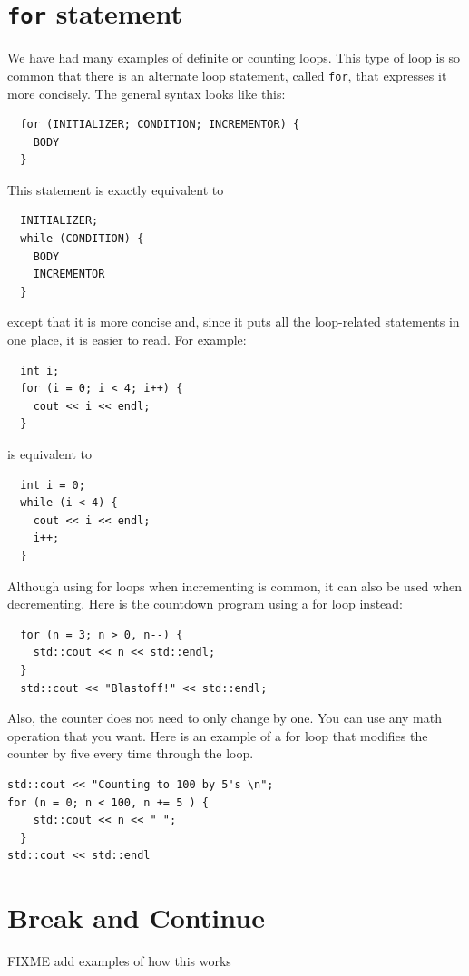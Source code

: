 \section{{\tt for} statement}
We have had many examples of definite or counting loops.
This type of loop is so common that there is an alternate
loop statement, called {\tt for}, that expresses it more
concisely.  The general syntax looks like this:

\begin{verbatim}
  for (INITIALIZER; CONDITION; INCREMENTOR) {
    BODY
  }
\end{verbatim}
%
This statement is exactly equivalent to

\begin{verbatim}
  INITIALIZER;
  while (CONDITION) {
    BODY
    INCREMENTOR
  }
\end{verbatim}
%
except that it is more concise and, since it puts all the
loop-related statements in one place, it is easier to read.
For example:

\begin{verbatim}
  int i;
  for (i = 0; i < 4; i++) {
    cout << i << endl;
  }
\end{verbatim}
%
is equivalent to 

\begin{verbatim}
  int i = 0;
  while (i < 4) {
    cout << i << endl;
    i++;
  }
\end{verbatim}

Although using for loops when incrementing is common, it can
also be used when decrementing. Here is the countdown program
using a for loop instead:

\begin{lstlisting}
  for (n = 3; n > 0, n--) {
    std::cout << n << std::endl;
  }
  std::cout << "Blastoff!" << std::endl;
\end{lstlisting}

Also, the counter does not need to only change by one. You can use
any math operation that you want. Here is an example of a for loop
that modifies the counter by five every time through the loop.
\begin{lstlisting}
std::cout << "Counting to 100 by 5's \n";
for (n = 0; n < 100, n += 5 ) {
    std::cout << n << " ";
  }
std::cout << std::endl
\end{lstlisting}

\section{Break and Continue}
FIXME add examples of how this works
